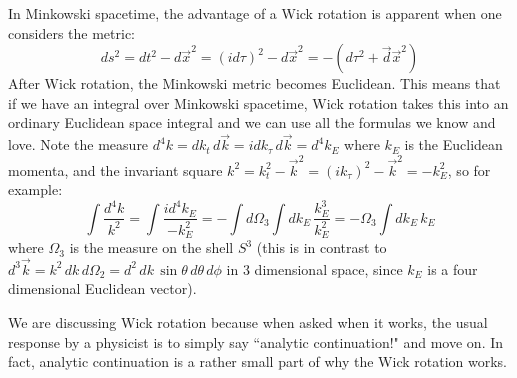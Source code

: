 \documentclass[11pt, oneside]{article}   	%
\theoremstyle{definition}
\begin{document}
In Minkowski spacetime, the advantage of a Wick rotation is apparent when one considers the metric:
\begin{equation}
	ds^2 = dt^2 - d\vec x^2 = (id\tau)^2 - d\vec x^2 = -(d\tau^2 + \vec d\vec x^2)
\end{equation}
After Wick rotation, the Minkowski metric becomes Euclidean. This means that if we have an integral over Minkowski 
spacetime, Wick rotation takes this into an ordinary Euclidean space integral and we can use all the formulas we know and 
love. Note the measure $d^4 k = dk_t\, d\vec k = i dk_\tau\, d\vec k = d^4 k_E$ where $k_E$ is the Euclidean momenta, and 
the invariant square $k^2 = k_t^2 - \vec k^2 = (ik_\tau)^2 - \vec k^2 = -k_E^2$, so for example:
\begin{equation}
	\int \frac{d^4 k}{k^2} = \int\frac{id^4 k_E}{-k_E^2} = -\int d\Omega_3 \int dk_E\, \frac{k_E^3}{k_E^2} = - \Omega_3 
	\int dk_E\, k_E
\end{equation}
where $\Omega_3$ is the measure on the shell $S^3$ (this is in contrast to $d^3\vec k = k^2\,dk\, d\Omega_2 = d^2\,dk\, 
\sin\theta\,d\theta\,d\phi$ in 3 dimensional space, since $k_E$ is a four dimensional Euclidean vector). 

We are discussing Wick rotation because when asked when it works, the usual response by a physicist is to simply say 
``analytic continuation!" and move on. In fact, analytic continuation is a rather small part of why the Wick rotation works. 
\end{document}

